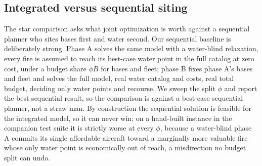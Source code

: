 \documentclass[11pt]{article}
\begin{document}
\subsection{Integrated versus sequential siting}
\label{sec:exp3}

The star comparison asks what joint optimization is worth against a
sequential planner who sites bases first and water second. Our
sequential baseline is deliberately strong. Phase A solves the same
model with a water-blind relaxation, every fire is assumed to reach
its best-case water point in the full catalog at zero cost, under a
budget share $\phi B$ for bases and fleet; phase B fixes phase A's
bases and fleet and solves the full model, real water catalog and
costs, real total budget, deciding only water points and recourse. We
sweep the split $\phi$ and report the best sequential result, so the
comparison is against a best-case sequential planner, not a straw man.
By construction the sequential solution is feasible for the integrated
model, so it can never win; on a hand-built instance in the companion
test suite it is strictly worse at every $\phi$, because a water-blind
phase A commits its single affordable aircraft toward a marginally
more valuable fire whose only water point is economically out of
reach, a misdirection no budget split can undo.
\end{document}
